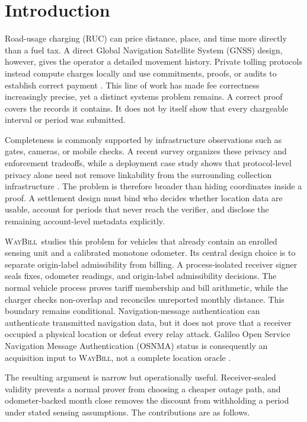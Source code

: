 \documentclass[conference]{IEEEtran}
\theoremstyle{plain}
\theoremstyle{definition}
\newcommand{\system}{\textsc{WayBill}}
\begin{document}
\section{Introduction}

Road-usage charging (RUC) can price distance, place, and time more directly
than a fuel tax. A direct Global Navigation Satellite System (GNSS) design,
however, gives the operator a detailed movement history. Private tolling
protocols instead compute charges locally and use commitments, proofs, or
audits to establish correct payment
\cite{Popa2009VPriv,Balasch2010PrETP,Meiklejohn2011Milo,Fetzer2020P4TC}.
This line of work has made fee correctness increasingly precise, yet a distinct
systems problem remains. A correct proof covers the records it contains. It
does not by itself show that every chargeable interval or period was submitted.

Completeness is commonly supported by infrastructure observations such as
gates, cameras, or mobile checks. A recent survey organizes these privacy and
enforcement tradeoffs, while a deployment case study shows that protocol-level
privacy alone need not remove linkability from the surrounding collection
infrastructure \cite{Jolfaei2023Survey,Jolfaei2024Brisbane}. The problem is
therefore broader than hiding coordinates inside a proof. A settlement design
must bind who decides whether location data are usable, account for periods
that never reach the verifier, and disclose the remaining account-level
metadata explicitly.

\system\ studies this problem for vehicles that already contain an enrolled
sensing unit and a calibrated monotone odometer. Its central design choice is
to separate origin-label admissibility from billing. A process-isolated receiver signer
seals fixes, odometer readings, and origin-label admissibility decisions. The normal
vehicle process proves tariff membership and bill arithmetic, while the
charger checks non-overlap and reconciles unreported monthly distance. This
boundary remains conditional. Navigation-message authentication can
authenticate transmitted navigation data, but it does not prove that a
receiver occupied a physical location or defeat every relay attack. Galileo
Open Service Navigation Message Authentication (OSNMA) status is consequently
an acquisition input to \system, not a complete location oracle
\cite{GalileoOSNMA2025,Psiaki2016GNSS,Sastry2003Location}.

The resulting argument is narrow but operationally useful. Receiver-sealed
validity prevents a normal prover from choosing a cheaper outage path, and
odometer-backed month close removes the discount from withholding a period
under stated sensing assumptions. The contributions are as follows.
\end{document}
